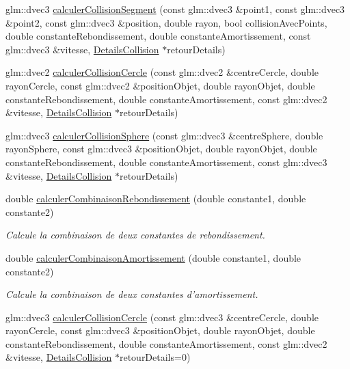 \begin{DoxyCompactItemize}
\item 
glm\-::dvec3 \hyperlink{namespaceaidecollision_a660f93dd53870ae81cca5f3f5351fb1d}{calculer\-Collision\-Segment} (const glm\-::dvec3 \&point1, const glm\-::dvec3 \&point2, const glm\-::dvec3 \&position, double rayon, bool collision\-Avec\-Points, double constante\-Rebondissement, double constante\-Amortissement, const glm\-::dvec3 \&vitesse, \hyperlink{classaidecollision_1_1_details_collision}{Details\-Collision} $\ast$retour\-Details)
\item 
glm\-::dvec2 \hyperlink{namespaceaidecollision_a2235ca4efaa88b78e633e3cc20a46ed1}{calculer\-Collision\-Cercle} (const glm\-::dvec2 \&centre\-Cercle, double rayon\-Cercle, const glm\-::dvec2 \&position\-Objet, double rayon\-Objet, double constante\-Rebondissement, double constante\-Amortissement, const glm\-::dvec2 \&vitesse, \hyperlink{classaidecollision_1_1_details_collision}{Details\-Collision} $\ast$retour\-Details)
\item 
glm\-::dvec3 \hyperlink{namespaceaidecollision_a8a4a626b26cfebe552797993020d7abd}{calculer\-Collision\-Sphere} (const glm\-::dvec3 \&centre\-Sphere, double rayon\-Sphere, const glm\-::dvec3 \&position\-Objet, double rayon\-Objet, double constante\-Rebondissement, double constante\-Amortissement, const glm\-::dvec3 \&vitesse, \hyperlink{classaidecollision_1_1_details_collision}{Details\-Collision} $\ast$retour\-Details)
\item 
double \hyperlink{namespaceaidecollision_a6237077a29518539015295311e39e2cc}{calculer\-Combinaison\-Rebondissement} (double constante1, double constante2)
\begin{DoxyCompactList}\small\item\em Calcule la combinaison de deux constantes de rebondissement. \end{DoxyCompactList}\item 
double \hyperlink{namespaceaidecollision_a617db5046c54f02f5bfa501aadc368d8}{calculer\-Combinaison\-Amortissement} (double constante1, double constante2)
\begin{DoxyCompactList}\small\item\em Calcule la combinaison de deux constantes d'amortissement. \end{DoxyCompactList}\item 
glm\-::dvec3 \hyperlink{namespaceaidecollision_acd095fc8bdec705478c33480be8516f5}{calculer\-Collision\-Cercle} (const glm\-::dvec3 \&centre\-Cercle, double rayon\-Cercle, const glm\-::dvec3 \&position\-Objet, double rayon\-Objet, double constante\-Rebondissement, double constante\-Amortissement, const glm\-::dvec2 \&vitesse, \hyperlink{classaidecollision_1_1_details_collision}{Details\-Collision} $\ast$retour\-Details=0)
\end{DoxyCompactItemize}



